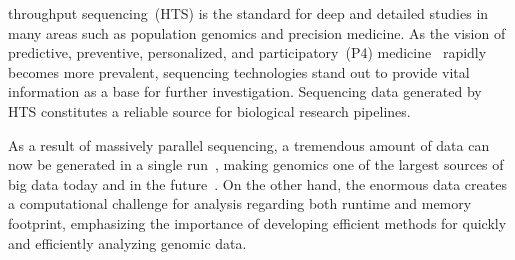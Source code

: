 



% 
% 
% 
% 
 
throughput sequencing~(HTS) is the standard for deep and detailed studies in many areas such as population genomics and precision medicine. As the vision of predictive, preventive, personalized, and participatory~(P4) medicine~\cite{flores2013p4} rapidly becomes more prevalent, sequencing technologies stand out to provide vital information as a base for further investigation. Sequencing data generated by HTS constitutes a reliable source for biological research pipelines. 

As a result of massively parallel sequencing, a tremendous amount of data can now be generated in a single run~\cite{xin2013accelerating, arram2017leveraging}, making genomics one of the largest sources of big data today and in the future~\cite{stephens2015big}. On the other hand, the enormous data creates a computational challenge for analysis regarding both runtime and memory footprint, emphasizing the importance of developing efficient methods for quickly and efficiently analyzing genomic data.

